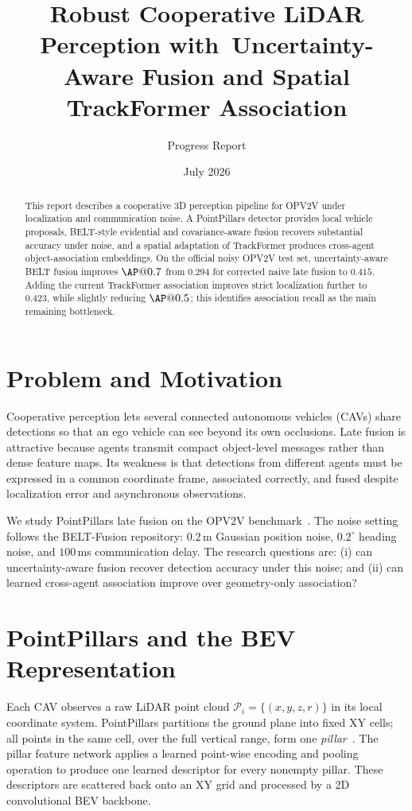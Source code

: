 \documentclass[11pt]{article}
\title{Robust Cooperative LiDAR Perception with\
Uncertainty-Aware Fusion and Spatial TrackFormer Association}
\author{Progress Report}
\date{July 2026}
\begin{document}
\maketitle

\begin{abstract}
This report describes a cooperative 3D perception pipeline for OPV2V under
localization and communication noise. A PointPillars detector provides local
vehicle proposals, BELT-style evidential and covariance-aware fusion recovers
substantial accuracy under noise, and a spatial adaptation of TrackFormer
produces cross-agent object-association embeddings. On the official noisy
OPV2V test set, uncertainty-aware BELT fusion improves $\AP@0.7$ from $0.294$
for corrected naive late fusion to $0.415$. Adding the current TrackFormer
association improves strict localization further to $0.423$, while slightly
reducing $\AP@0.5$; this identifies association recall as the main remaining
bottleneck.
\end{abstract}

\section{Problem and Motivation}

Cooperative perception lets several connected autonomous vehicles (CAVs)
share detections so that an ego vehicle can see beyond its own occlusions.
Late fusion is attractive because agents transmit compact object-level
messages rather than dense feature maps. Its weakness is that detections from
different agents must be expressed in a common coordinate frame, associated
correctly, and fused despite localization error and asynchronous observations.

We study PointPillars late fusion on the OPV2V benchmark~\cite{opv2v}. The
noise setting follows the BELT-Fusion repository: $0.2\,$m Gaussian position
noise, $0.2^\circ$ heading noise, and $100\,$ms communication delay. The
research questions are: (i) can uncertainty-aware fusion recover detection
accuracy under this noise; and (ii) can learned cross-agent association
improve over geometry-only association?

\section{PointPillars and the BEV Representation}

Each CAV observes a raw LiDAR point cloud
$\mathcal{P}_i=\{(x,y,z,r)\}$ in its local coordinate system. PointPillars
partitions the ground plane into fixed XY cells; all points in the same cell,
over the full vertical range, form one \emph{pillar}~\cite{pointpillars}.
The pillar feature network applies a learned point-wise encoding and pooling
operation to produce one learned descriptor for every nonempty pillar. These
descriptors are scattered back onto an XY grid and processed by a 2D
convolutional BEV backbone.
\end{document}
